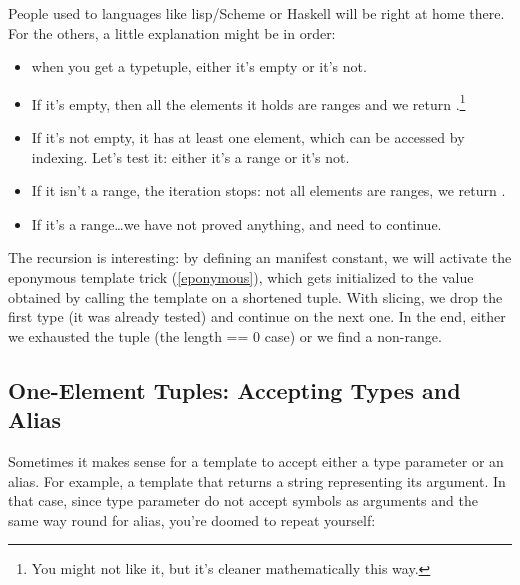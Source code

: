 
People used to languages like lisp/Scheme or Haskell will be right at home there. For the others, a little explanation might be in order: 

\begin{itemize}
\item when you get a typetuple, either it's empty or it's not. 
	\item If it's empty, then all the elements it holds are ranges and we return .\footnote{ You might not like it, but it's cleaner mathematically this way.} 
	\item If it's not empty, it has at least one element, which can be accessed by indexing. Let's test it: either it's a range or it's not. 
		\item If it isn't a range, the iteration stops: not all elements are ranges, we return . 
		\item If it's a range\ldots we have not proved anything, and need to continue.
\end{itemize}

The recursion is interesting: by defining an  manifest constant, we will activate the eponymous template trick (\ref{eponymous}), which gets initialized to the value obtained by calling the template on a shortened tuple. With slicing, we drop the first type (it was already tested) and continue on the next one. In the end, either we exhausted the tuple (the length == 0 case) or we find a non-range.


\subsection{One-Element Tuples: Accepting Types and Alias}

Sometimes it makes sense for a template to accept either a type parameter or an alias. For example, a template that returns a string representing its argument. In that case, since type parameter do not accept symbols as arguments and the same way round for alias, you're doomed to repeat yourself:

